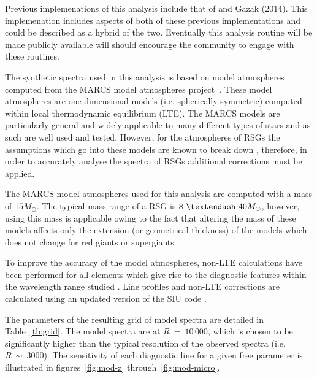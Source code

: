 Previous implemenations of this analysis include that of
\cite{2010MNRAS.407.1203D} and Gazak (2014).
This implemenation includes aspects of both of these previous implementations and could be described as a hybrid of the two.
Eventually this analysis routine will be made publicly available will should encourage the community to engage with these routines.



The synthetic spectra used in this analysis is based on model atmospheres computed from the
MARCS model atmospheres project~\citep{2008A&A...486..951G}.
These model atmospheres are one-dimensional models (i.e. spherically symmetric)
computed within local thermodynamic equilibrium (LTE).
The MARCS models are particularly general and widely applicable to many different types of stars and as such are well used and tested.
However, for the atmospheres of RSGs the assumptions which go into these models are known to break down
\citep{2002AN....323..213F,2010ASPC..425..124P},
therefore, in order to accurately analyse the spectra of RSGs additional corrections must be applied.

The MARCS model atmospheres used for this analysis are computed with a mass of $15M_{\odot}$.
The typical mass range of a RSG is $8~\textendash~40M_{\odot}$, however,
using this mass is applicable owing to the fact that altering the mass of these models affects only the extension
(or geometrical thickness) of the models which does not change for red giants or supergiants
\citep{2010MNRAS.407.1203D}.

To improve the accuracy of the model atmospheres,
non-LTE calculations have been performed for all elements which give rise to the diagnostic features within the wavelength range studied
\citep{2012ApJ...751..156B,2013ApJ...764..115B,2014arXiv1412.6527B}.
Line profiles and non-LTE corrections are calculated using an updated version of the SIU code
\citep{1999PhDT.........3R,2012ApJ...751..156B}.

The parameters of the resulting grid of model spectra are detailed in
Table~\ref{tb:grid}.
The model spectra are at $R~=~10\,000$,
which is chosen to be significantly higher than the typical resolution of the observed spectra
(i.e. $R~\sim~3000$).
The sensitivity of each diagnostic line for a given free parameter is illustrated in figures~\ref{fig:mod-z} through~\ref{fig:mod-micro}.

